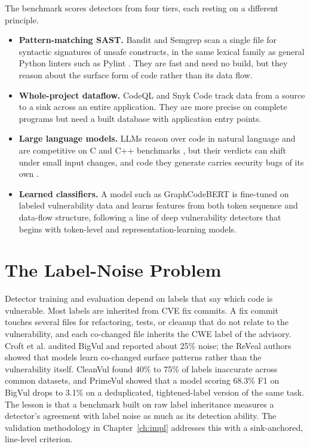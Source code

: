 The benchmark scores detectors from four tiers, each resting on a different
principle.

\begin{itemize}
  \item \textbf{Pattern-matching SAST.} Bandit \cite{bandit} and Semgrep
    \cite{semgrep} scan a single file for syntactic signatures of unsafe
    constructs, in the same lexical family as general Python linters such as
    Pylint \cite{pylint}. They are fast and need no build, but they reason about
    the surface form of code rather than its data flow.
  \item \textbf{Whole-project dataflow.} CodeQL \cite{codeql} and Snyk Code
    track data from a source to a sink across an entire application. They are
    more precise on complete programs but need a built database with
    application entry points.
  \item \textbf{Large language models.} LLMs reason over code in natural
    language and are competitive on C and C++ benchmarks
    \cite{khare_llm,steenhoek}, but their verdicts can shift under small input
    changes, and code they generate carries security bugs of its own
    \cite{pearce2022}.
  \item \textbf{Learned classifiers.} A model such as GraphCodeBERT
    \cite{graphcodebert,codebert} is fine-tuned on labeled vulnerability data
    and learns features from both token sequence and data-flow structure,
    following a line of deep vulnerability detectors that begins with token-level
    \cite{vuldeepecker} and representation-learning \cite{russell2018} models.
\end{itemize}

\section{The Label-Noise Problem}

Detector training and evaluation depend on labels that say which code is
vulnerable. Most labels are inherited from CVE fix commits. A fix commit
touches several files for refactoring, tests, or cleanup that do not relate to
the vulnerability, and each co-changed file inherits the CWE label of
the advisory. Croft et al. \cite{croft} audited BigVul and reported about 25\%
noise; the ReVeal authors \cite{reveal} showed that models learn co-changed
surface patterns rather than the vulnerability itself. CleanVul \cite{cleanvul}
found 40\% to 75\% of labels inaccurate across common datasets, and
PrimeVul \cite{primevul} showed that a model scoring 68.3\% F1 on BigVul drops
to 3.1\% on a deduplicated, tightened-label version of the same task. The
lesson is that a benchmark built on raw label inheritance measures a detector's
agreement with label noise as much as its detection ability. The validation
methodology in Chapter~\ref{ch:impl} addresses this with a sink-anchored,
line-level criterion.

